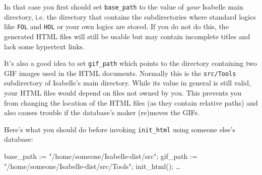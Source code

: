 In that case you first should set {\tt base_path} to the value of {\em
your} Isabelle main directory, i.e. the directory that contains the
subdirectories where standard logics like {\tt FOL} and {\tt HOL} or
your own logics are stored. If you do not do this, the generated HTML
files will still be usable but may contain incomplete titles and lack
some hypertext links.

It's also a good idea to set {\tt gif_path} which points to the
directory containing two GIF images used in the HTML documents.
Normally this is the \texttt{src/Tools} subdirectory of Isabelle's
main directory. While its value in general is still valid, your HTML
files would depend on files not owned by you. This prevents you from
changing the location of the HTML files (as they contain relative
paths) and also causes trouble if the database's maker (re)moves the
GIFs.

Here's what you should do before invoking {\tt init_html} using
someone else's \ML{} database:

\begin{ttbox}
base_path := "/home/someone/Isabelle-dist/src";
gif_path := "/home/someone/Isabelle-dist/src/Tools";
init_html();
\dots
\end{ttbox}
